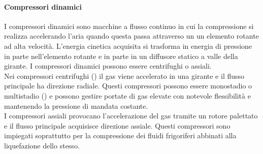\paragraph{Compressori dinamici}
I compressori dinamici sono macchine a flusso continuo in cui la compressione si realizza accelerando l'aria quando questa passa attraverso un un elemento rotante ad alta velocità. L'energia cinetica acquisita si trasforma in energia di pressione in parte nell'elemento rotante e in parte in un diffusore statico a valle della girante. I compressori dinamici possono essere centrifughi o assiali.\\
Nei compressori centrifughi () il gas viene accelerato in una girante e il flusso principale ha direzione radiale. Questi compressori possono essere monostadio o multistadio () e possono gestire portate di gas elevate con notevole flessibilità e mantenendo la pressione di mandata costante.\\%
I compressori assiali provocano l'accelerazione del gas tramite un rotore palettato e il flusso principale acquisisce direzione assiale. Questi compressori sono impiegati soprattutto per la compressione dei fluidi frigoriferi abbinati alla liquefazione dello stesso.

